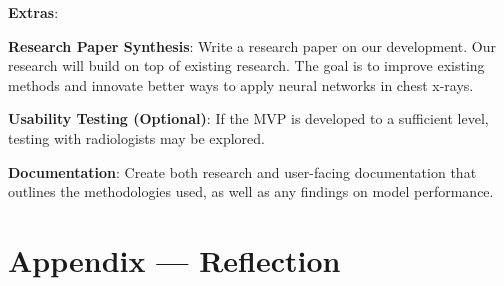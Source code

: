 \documentclass{article}
\begin{document}
\textbf{Extras}:
\begin{itemize}
\begin{item}
    \textbf{Research Paper Synthesis}: Write a research paper on our development. Our research will build on top of existing research. The goal is to improve existing methods and innovate better ways to apply neural networks in chest x-rays.
\end{item}
\begin{item}
    \textbf{Usability Testing (Optional)}: If the MVP is developed to a sufficient level, testing with radiologists may be explored.
\end{item}
\begin{item}
\textbf{Documentation}: Create both research and user-facing documentation that outlines the methodologies used, as well as any findings on model performance.
\end{item}
\end{itemize}

\newpage{}

\section*{Appendix --- Reflection}
\end{document}
